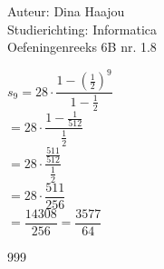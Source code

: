 \documentclass[a4paper]{article}
\begin{document}
\normalsize

\noindent \large Auteur: Dina Haajou \\
\noindent \large Studierichting: Informatica \\
\noindent \large Oefeningenreeks 6B nr. 1.8 \\

\normalsize

$ s_9 = 28 \cdot \dfrac{1 - \left(\tfrac{1}{2}\right)^9}{1 - \tfrac{1}{2}} $ \\

$ = 28 \cdot \dfrac{1 - \tfrac{1}{512}}{\tfrac{1}{2}} $ \\

$ = 28 \cdot \dfrac{\tfrac{511}{512}}{\tfrac{1}{2}} $ \\

$ = 28 \cdot \dfrac{511}{256} $ \\

$ = \dfrac{14308}{256} = \dfrac{3577}{64} $ \\

\begin{thebibliography}{999}
\end{thebibliography}
\end{document}
